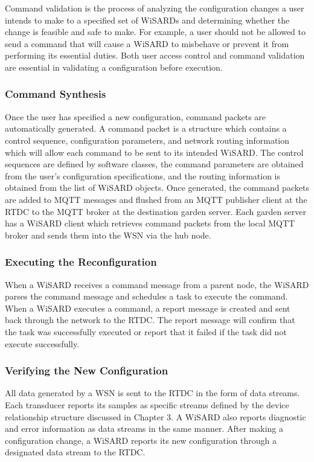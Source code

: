 Command validation is the process of analyzing the configuration changes a user intends to make to a specified set of WiSARDs and determining whether the change is feasible and safe to make. For example, a user should not be allowed to send a command that will cause a WiSARD to misbehave or prevent it from performing its essential duties. Both user access control and command validation are essential in validating a configuration before execution.


\subsubsection{Command Synthesis}
Once the user has specified a new configuration, command packets are automatically generated. A command packet is a structure which contains a control sequence, configuration parameters, and network routing information which will allow each command to be sent to its intended WiSARD. The control sequences are defined by software classes, the command parameters are obtained from the user's configuration specifications, and the routing information is obtained from the list of WiSARD objects. Once generated, the command packets are added to MQTT messages and flushed from an MQTT publisher client at the RTDC to the MQTT broker at the destination garden server. Each garden server has a WiSARD client which retrieves command packets from the local MQTT broker and sends them into the WSN via the hub node. 

\subsubsection{Executing the Reconfiguration}
When a WiSARD receives a command message from a parent node, the WiSARD parses the command message and schedules a task to execute the command. When a WiSARD executes a command, a report message is created and sent back through the network to the RTDC. The report message will confirm that the task was successfully executed or report that it failed if the task did not execute successfully.

\subsubsection{Verifying the New Configuration}
All data generated by a WSN is sent to the RTDC in the form of data streams. Each transducer reports its samples as specific streams defined by the device relationship structure discussed in Chapter 3. A WiSARD also reports diagnostic and error information as data streams in the same manner. After making a configuration change, a WiSARD reports its new configuration through a designated data stream to the RTDC. 

